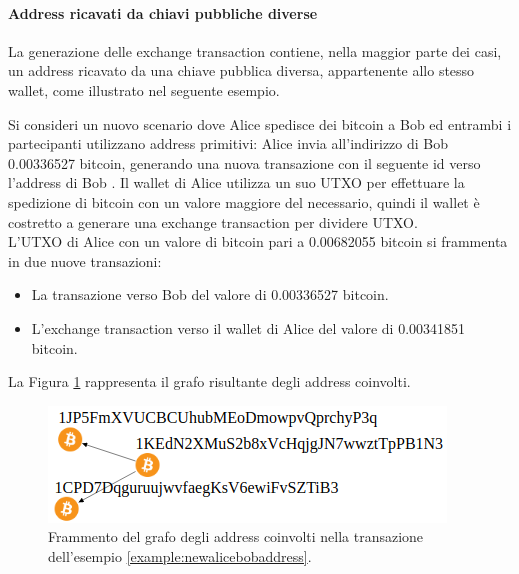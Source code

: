 \paragraph*{Address ricavati da chiavi pubbliche diverse} La generazione delle exchange transaction contiene, nella maggior parte dei casi, un address ricavato da una chiave pubblica diversa, appartenente allo stesso wallet, come illustrato nel seguente esempio.

\begin{example} \label{example:newalicebobaddress}
   Si consideri un nuovo scenario dove Alice spedisce dei bitcoin a Bob ed entrambi i partecipanti utilizzano address primitivi: Alice invia all’indirizzo di Bob 0.00336527 bitcoin, generando una nuova transazione con il seguente id  verso l’address di Bob .
    Il wallet di Alice utilizza un suo UTXO per effettuare la spedizione di bitcoin con un valore maggiore del necessario, quindi il wallet è costretto a generare una exchange transaction per dividere UTXO. \\
    L’UTXO di Alice con un valore di bitcoin pari a 0.00682055 bitcoin si frammenta in due nuove transazioni:

    \begin{itemize}
      \item La transazione verso Bob del valore di 0.00336527 bitcoin.
      \item L’exchange transaction verso il wallet di Alice del valore di 0.00341851 bitcoin.
    \end{itemize}

La Figura \ref{fig:newalicebobaddress} rappresenta il grafo risultante degli address coinvolti.

\begin{figure}[H]
\centering
    \includegraphics[scale=0.43]{images/exampleWithGraph/example-p2pkh-exchange-transaction.png}
    \caption{Frammento  del grafo degli address coinvolti nella transazione dell’esempio \ref{example:newalicebobaddress}.\label{fig:newalicebobaddress}}
\end{figure}


\end{example}
